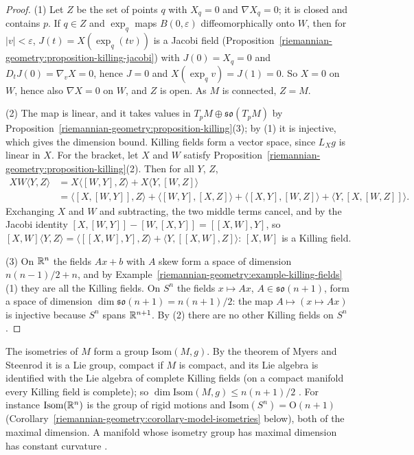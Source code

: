 \begin{proof}
(1) Let $Z$ be the set of points $q$ with $X_q = 0$ and $\nabla X_q = 0$; it is closed and contains $p$. If $q \in Z$ and $\exp_q$ maps $B(0, \varepsilon)$
diffeomorphically onto $W$, then for $|v| < \varepsilon$, $J(t) = X(\exp_q(tv))$ is a Jacobi field (Proposition~\ref{riemannian-geometry:proposition-killing-jacobi}) with
$J(0) = X_q = 0$ and $D_tJ(0) = \nabla_vX = 0$, hence $J = 0$ and $X(\exp_qv) = J(1) = 0$. So $X = 0$ on $W$, hence also $\nabla X = 0$ on $W$, and $Z$ is open. As $M$
is connected, $Z = M$.

(2) The map is linear, and it takes values in $T_pM \oplus \mathfrak{so}(T_pM)$ by Proposition~\ref{riemannian-geometry:proposition-killing}(3); by (1) it is
injective, which gives the dimension bound. Killing fields form a vector space, since $L_Xg$ is linear in $X$. For the bracket, let $X$ and $W$ satisfy
Proposition~\ref{riemannian-geometry:proposition-killing}(2). Then for all $Y$, $Z$,
\[
\begin{aligned}
XW\langle Y, Z\rangle &= X\langle[W, Y], Z\rangle + X\langle Y, [W, Z]\rangle \\
&= \langle[X, [W, Y]], Z\rangle + \langle[W, Y], [X, Z]\rangle + \langle[X, Y], [W, Z]\rangle + \langle Y, [X, [W, Z]]\rangle .
\end{aligned}
\]
Exchanging $X$ and $W$ and subtracting, the two middle terms cancel, and by the Jacobi identity $[X, [W, Y]] - [W, [X, Y]] = [[X, W], Y]$, so
$[X, W]\langle Y, Z\rangle = \langle[[X, W], Y], Z\rangle + \langle Y, [[X, W], Z]\rangle$: $[X, W]$ is a Killing field.

(3) On $\mathbb{R}^n$ the fields $Ax + b$ with $A$ skew form a space of dimension $n(n - 1)/2 + n$, and by
Example~\ref{riemannian-geometry:example-killing-fields}(1) they are all the Killing fields. On $S^n$ the fields $x \mapsto Ax$, $A \in \mathfrak{so}(n + 1)$, form a space of
dimension $\dim\mathfrak{so}(n + 1) = n(n + 1)/2$: the map $A \mapsto (x \mapsto Ax)$ is injective because $S^n$ spans $\mathbb{R}^{n+1}$. By (2) there are no other Killing
fields on $S^n$.
\end{proof}

\begin{remark}\label{riemannian-geometry:remark-myers-steenrod}
The isometries of $M$ form a group $\mathrm{Isom}(M, g)$. By the theorem of Myers and Steenrod it is a Lie group, compact if $M$ is compact, and its Lie algebra is
identified with the Lie algebra of complete Killing fields (on a compact manifold every Killing field is complete); so
$\dim\mathrm{Isom}(M, g) \leq n(n + 1)/2$ \cite[Chapter VI]{kobayashi-nomizu}. For instance $\mathrm{Isom}(\mathbb{R}^n)$ is the group of rigid motions and
$\mathrm{Isom}(S^n) = \mathrm{O}(n + 1)$ (Corollary~\ref{riemannian-geometry:corollary-model-isometries} below), both of the maximal dimension. A manifold whose isometry
group has maximal dimension has constant curvature \cite[Chapter VI]{kobayashi-nomizu}.
\end{remark}


